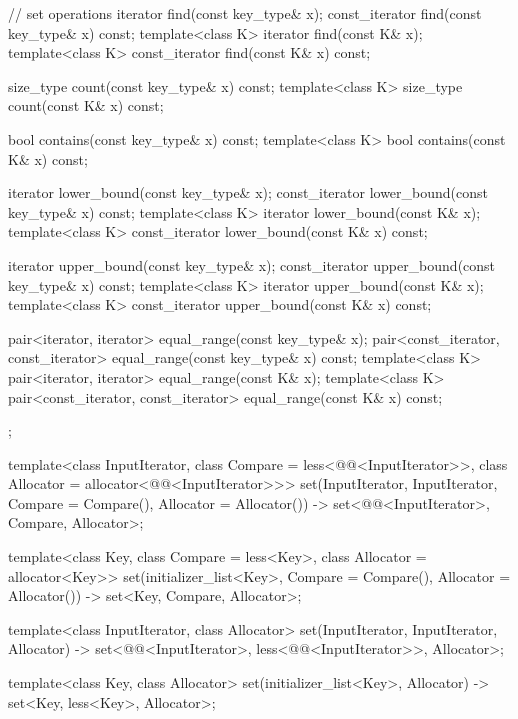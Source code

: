 \begin{codeblock}
{{    // set operations
    iterator       find(const key_type& x);
    const_iterator find(const key_type& x) const;
    template<class K> iterator       find(const K& x);
    template<class K> const_iterator find(const K& x) const;

    size_type      count(const key_type& x) const;
    template<class K> size_type count(const K& x) const;

    bool           contains(const key_type& x) const;
    template<class K> bool contains(const K& x) const;

    iterator       lower_bound(const key_type& x);
    const_iterator lower_bound(const key_type& x) const;
    template<class K> iterator       lower_bound(const K& x);
    template<class K> const_iterator lower_bound(const K& x) const;

    iterator       upper_bound(const key_type& x);
    const_iterator upper_bound(const key_type& x) const;
    template<class K> iterator       upper_bound(const K& x);
    template<class K> const_iterator upper_bound(const K& x) const;

    pair<iterator, iterator>               equal_range(const key_type& x);
    pair<const_iterator, const_iterator>   equal_range(const key_type& x) const;
    template<class K>
      pair<iterator, iterator>             equal_range(const K& x);
    template<class K>
      pair<const_iterator, const_iterator> equal_range(const K& x) const;
  };

  template<class InputIterator,
           class Compare = less<@@<InputIterator>>,
           class Allocator = allocator<@@<InputIterator>>>
    set(InputIterator, InputIterator,
        Compare = Compare(), Allocator = Allocator())
      -> set<@@<InputIterator>, Compare, Allocator>;

  template<class Key, class Compare = less<Key>, class Allocator = allocator<Key>>
    set(initializer_list<Key>, Compare = Compare(), Allocator = Allocator())
      -> set<Key, Compare, Allocator>;

  template<class InputIterator, class Allocator>
    set(InputIterator, InputIterator, Allocator)
      -> set<@@<InputIterator>,
             less<@@<InputIterator>>, Allocator>;

  template<class Key, class Allocator>
    set(initializer_list<Key>, Allocator) -> set<Key, less<Key>, Allocator>;
}
\end{codeblock}%
%

